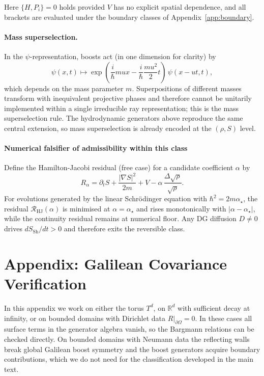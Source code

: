 \documentclass[11pt,a4paper]{article}
\numberwithin{equation}{section}
\theoremstyle{thmcompact}
\theoremstyle{remark}
\begin{document}
Here $\{H,P_i\}=0$ holds provided $V$ has no explicit spatial dependence, and all brackets are evaluated under the boundary classes of Appendix~\ref{app:boundary}.

\paragraph{Mass superselection.}
In the $\psi$-representation, boosts act (in one dimension for clarity) by
\[
\psi(x,t)\longmapsto
\exp\!\left(\frac{i}{\hbar} m u x - \frac{i}{\hbar}\frac{m u^2}{2}t\right)\,
\psi(x-ut,t),
\]
which depends on the mass parameter $m$. Superpositions of different masses transform with inequivalent projective phases and therefore cannot be unitarily implemented within a single irreducible ray representation; this is the mass superselection rule. The hydrodynamic generators above reproduce the same central extension, so mass superselection is already encoded at the $(\rho,S)$ level.

\paragraph{Numerical falsifier of admissibility within this class}
Define the Hamilton-Jacobi residual (free case) for a candidate coefficient $\alpha$ by
\[
R_\alpha=\partial_t S+\frac{|\nabla S|^2}{2m}+V
-\alpha\,\frac{\Delta\sqrt{\rho}}{\sqrt{\rho}}.
\]
For evolutions generated by the linear Schrödinger equation with $\hbar^2=2m\alpha_\star$, the residual $\mathcal{R}_{\mathrm{HJ}}(\alpha)$ is minimised at $\alpha=\alpha_\star$ and rises monotonically with $|\alpha-\alpha_\star|$, while the continuity residual remains at numerical floor. Any DG diffusion $D\ne0$ drives $dS_{\mathrm{Sh}}/dt>0$ and therefore exits the reversible class.

\section{Appendix: Galilean Covariance Verification}
\label{app:galilean}

In this appendix we work on either the torus $T^{d}$, on $\mathbb{R}^{d}$ with
sufficient decay at infinity, or on bounded domains with Dirichlet data
$R|_{\partial\Omega}=0$. In these cases all surface terms in the generator
algebra vanish, so the Bargmann relations can be checked directly. On bounded
domains with Neumann data the reflecting walls break global Galilean boost
symmetry and the boost generators acquire boundary contributions, which we do
not need for the classification developed in the main text.
\end{document}
